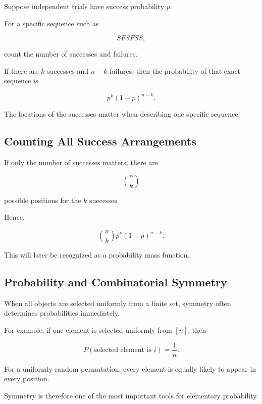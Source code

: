 Suppose independent trials have success probability \(p\).

For a specific sequence such as

\[
SFSFSS,
\]

count the number of successes and failures.

If there are \(k\) successes and \(n-k\) failures, then the probability
of that exact sequence is

\[
\boxed{
p^k(1-p)^{n-k}.
}
\]

The locations of the successes matter when describing one specific
sequence.

\subsection{Counting All Success Arrangements}
\label{subsec:count-success-arrangements}

If only the number of successes matters, there are

\[
\binom nk
\]

possible positions for the \(k\) successes.

Hence,

\[
\boxed{
\binom nkp^k(1-p)^{n-k}.
}
\]

This will later be recognized as a probability mass function.

\subsection{Probability and Combinatorial Symmetry}
\label{subsec:probability-combinatorial-symmetry}

When all objects are selected uniformly from a finite set, symmetry
often determines probabilities immediately.

For example, if one element is selected uniformly from \([n]\), then

\[
\boxed{
P(\text{selected element is }i)
=
\frac1n.
}
\]

For a uniformly random permutation, every element is equally likely to
appear in every position.

Symmetry is therefore one of the most important tools for elementary
probability.


